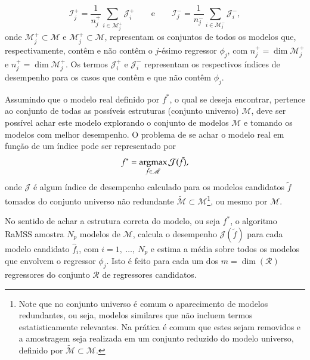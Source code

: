 \begin{equation}
   \mathcal{I}^+_j = \frac{1}{n_j^+}\sum_{i \in \mathscr{M}_j^+}\mathcal{J}^{+}_{i} \qquad \text{e} \qquad \mathcal{I}^-_j = \frac{1}{n_j^-}\sum_{i \in \mathscr{M}_j^-}\mathcal{J}^{-}_{i},
\label{eq:avgRefPerf}
\end{equation}
onde $ \mathscr{M}^+_j \subset \mathscr{M}$ e $ \mathscr{M}^+_j \subset \mathscr{M}$, representam os conjuntos de todos os modelos que, respectivamente, contêm e não contêm o $j$-ésimo regressor $\phi_j$, com $n_j^+ = \dim \mathscr{M}^+_j $ e $n_j^+ = \dim \mathscr{M}^+_j$. Os termos $\mathcal{J}^{+}_{i}$ e  $\mathcal{J}^{-}_{i}$ representam os respectivos índices de desempenho para os casos que contêm e que não contêm $\phi_j$.




Assumindo que o modelo real definido por $f^*$, o qual se deseja encontrar, pertence ao conjunto de todas as possíveis estruturas (conjunto universo) $\mathscr{M}$, deve ser possível achar este modelo explorando o conjunto de modelos $\mathscr{M}$ e tomando os modelos com melhor desempenho.  O problema de se achar o modelo real em função de um índice pode ser representado por
\begin{equation}
   f^* = \operatorname*{argmax}_{\tilde{f} \in \tilde{\mathscr{M}}} \mathcal{J}(\tilde{f}),
\label{eq:fStar}
\end{equation}
onde $ \mathcal{J}$ é algum índice de desempenho calculado para os modelos candidatos $\tilde{f}$ tomados do conjunto universo não redundante  $\tilde{\mathscr{M}} \subset{\mathscr{M}}$\footnote{Note que no conjunto universo é comum o aparecimento de modelos redundantes, ou seja, modelos similares que não incluem termos estatisticamente relevantes. Na prática é comum que estes sejam removidos e a amostragem seja realizada em um conjunto reduzido do modelo universo, definido por $\tilde{\mathscr{M}} \subset \mathscr{M}$.}, ou mesmo por $ \mathscr{M}$.

No sentido de achar a estrutura correta do modelo, ou seja $ f^*$, o algoritmo RaMSS amostra $N_p$ modelos de $ \mathscr{M}$, calcula o desempenho $\mathcal{J}(\tilde{f})$ para cada modelo candidato $\hat{f}_{i}$, com $i=1,\ \dots,\ N_p$ e estima a média sobre todos os modelos que envolvem o regressor $\phi_j$. Isto é feito para cada um dos $m=\dim(\mathscr{R})$ regressores do conjunto $\mathscr{R}$ de regressores candidatos.

